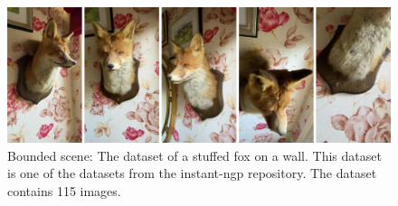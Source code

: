 \begin{figure}[h]
    \centering
    \includegraphics[width=1.0\textwidth]{figures/fox-dataset.png}
    \caption{Bounded scene: The dataset of a stuffed fox on a wall. This dataset is one of the datasets from the instant-ngp repository. The dataset contains 115 images.}
    \label{fig:fox-dataset}
\end{figure}